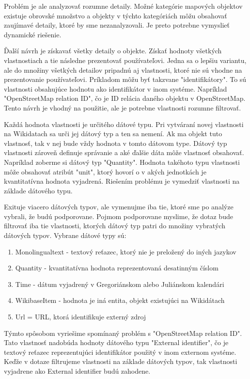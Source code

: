Problém je ale analyzovať rozumne detaily. Možné kategórie mapových objektov existuje obrovské množstvo a objekty v týchto kategóriách môžu obsahovať
zaujímavé detaily, ktoré by sme nezanalyzovali. Je preto potrebne vymyslieť dynamické riešenie.

Ďalší návrh je získavať všetky detaily o objekte. Získať hodnoty všetkých vlastnostiach a tie následne prezentovať používateľovi.
Jedna sa o lepšiu variantu, ale do množiny všetkých detailov pripadnú aj vlastnosti, ktoré nie sú vhodne na prezentovanie používateľovi.
Príkladom môžu byť takzvane "identifikátory". To sú vlastnosti obsahujúce hodnotu ako
identifikátor v inom systéme. Napríklad "OpenStreetMap relation ID", čo je ID relácia daného objektu v OpenStreetMap.
Tento návrh je vhodný na použitie, ale je potrebne vlastnosti rozumne filtrovať.

Každá hodnota vlastnosti je určitého dátové typu. Pri vytváraní novej vlastnosti na Wikidatach sa urči jej
dátový typ a ten sa nemení. Ak ma objekt tuto vlastnosť, tak v nej bude vždy hodnota v tomto dátovom type. Dátový typ vlastnosti zároveň definuje správanie a aké ďalšie dáta môže vlastnosť obsahovať.
Napríklad zoberme si dátový typ "Quantity". Hodnota takéhoto typu vlastnosti môže obsahovať  atribút "unit", ktorý hovorí o v akých jednotkách je kvantitatívna hodnota vyjadrená.
Riešením problému je vymedziť vlastnosti na základe dátového typu.

Exituje viacero dátových typov, ale vymenujme iba tie, ktoré sme po analýze vybrali, že budú podporovane.
Pojmom podporovane myslime, že dotaz bude filtrovať iba tie vlastnosti, ktorých dátový typ patri do množiny vybratých dátových typov.
Vybrane dátové typy sú:
\begin{enumerate}
      \item Monolingualtext - textový reťazec, ktorý nie je preložený do iných jazykov
      \item Quantity - kvantitatívna hodnota reprezentovaná desatinným číslom
      \item Time - dátum vyjadrený v Gregoriánskom alebo Juliánskom kalendári
      \item WikibaseItem - hodnota je iná entita, objekt existujúci na Wikidátach
      \item Url = URL, ktorá identifikuje externý zdroj
\end{enumerate}

Týmto spôsobom vyriešime spomínaný problém s "OpenStreetMap relation ID". Tato vlastnosť nadobúda hodnoty dátového typu
"External identifier", čo je textový reťazec reprezentujúci identifikátor použitý v inom externom systéme.
Keďže v dotaze filtrujeme vlastnosti na základe dátových typov, tak vlastnosti vyjadrene ako External identifier
budú zahodene.

